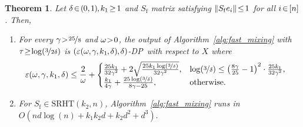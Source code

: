 \documentclass[11pt]{article}
\newtheorem{thm}{Theorem}
\theoremstyle{definition}
\theoremstyle{plain}
\providecommand{\algorithmref}[1]{Algorithm~\ref{#1}}
\newcommand{\eps}{{\varepsilon}}
\newcommand{\Norm}[1]{\left\| #1 \right\|}
\providecommand{\norm}[1]{\Norm{#1}}
\newcommand{\DP}{{\normalfont DP}~}
\renewcommand{\eps}{\varepsilon}
\begin{document}
\begin{thm}
    \label{thm:Privacy_First}
    Let $\delta \hspace{-0.15em}\in\hspace{-0.15em} (\hspace{-0.05em}0,\hspace{-0.05em}1\hspace{-0.05em})\hspace{-0.05em}, \hspace{-0.05em} k_1 \hspace{-0.15em}\geq\hspace{-0.15em} 1$ and $S_{\mathrm{f}}$ matrix satisfying $\norm{S_{\mathrm{f}}e_i} \hspace{-0.15em}\leq\hspace{-0.15em} 1$ for all $i\hspace{-0.15em}\in\hspace{-0.15em} [n]$. Then,
    \begin{enumerate}[leftmargin=1.25em]
        \item For every $\gamma \hspace{-0.2em}>\hspace{-0.2em} \nicefrac{25}{8}$ and $\omega\hspace{-0.2em}>\hspace{-0.2em} 0$, the output of \algorithmref{alg:fast_mixing} with $\tau \hspace{-0.2em}\geq\hspace{-0.2em} \log(\nicefrac{3}{2\delta})$ is $(\eps(\omega\hspace{-0.05em},\hspace{-0.05em} \gamma\hspace{-0.05em},\hspace{-0.05em} k_1\hspace{-0.05em},\hspace{-0.05em} \delta)\hspace{-0.05em},\hspace{-0.05em}\delta)$-\DP with respect to $X$ where 
        \begin{align}
            \label{eq:eps_bound_theorem1}
            \eps(\omega, \gamma, k_1, \delta) &\leq \frac{2}{\omega} + 
                \begin{cases}
                    \frac{25k_1}{32\gamma^2}+2\sqrt{\frac{25k_1\log(\nicefrac{3}{\delta})}{32\gamma^2}},&\log(\nicefrac{3}{\delta})\leq \left(\frac{8\gamma}{25} - 1\right)^2\cdot \frac{25k_1}{32\gamma^2},\\
                    \frac{k_1}{4\gamma}+\frac{25\log(\nicefrac{3}{\delta})}{8\gamma-25},&\mathrm{otherwise}.
                \end{cases}
        \end{align}
        \item For $S_{\mathrm{f}}\in \mathrm{SRHT}(k_2, n)$, \algorithmref{alg:fast_mixing} runs in $O\left(nd\log(n) + k_1k_2d + k_2 d^2 + d^3\right).$
    \end{enumerate}
\end{thm}
\end{document}

